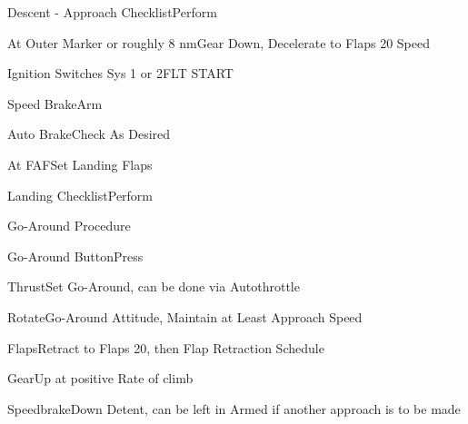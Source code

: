 \documentclass[sim-use, blue_items]{checklist}
\begin{document}
\begin{continuedchecklist}
{	}
	\item{Descent - Approach Checklist}{Perform} %
	\item{At Outer Marker or roughly 8 nm}{Gear Down, Decelerate to Flaps 20 Speed}
	\item{Ignition Switches Sys 1 or 2}{FLT START}
	\item{Speed Brake}{Arm}
	\item{Auto Brake}{Check As Desired}
	\item{At FAF}{Set Landing Flaps}
	\item{Landing Checklist}{Perform}
\end{continuedchecklist}

\begin{checklist}{Go-Around Procedure}
	\item{Go-Around Button}{Press}
	\item{Thrust}{Set Go-Around, can be done via Autothrottle}
	\item{Rotate}{Go-Around Attitude, Maintain at Least Approach Speed}
	\item{Flaps}{Retract to Flaps 20, then Flap Retraction Schedule}
	\item{Gear}{Up at positive Rate of climb}
	\item{Speedbrake}{Down Detent, can be left in Armed if another approach is to be made}
\end{checklist}
\end{document}
